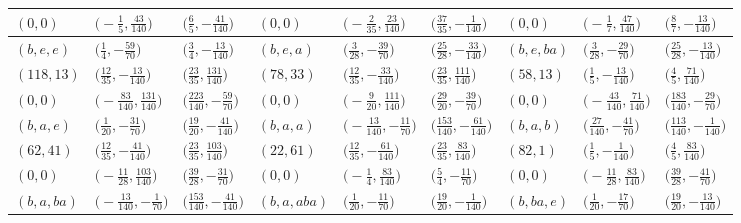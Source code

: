 \documentclass[pdftex]{sigma}
\theoremstyle{definition}
\numberwithin{equation}{section}
\begin{document}
\begin{landscape}
\begin{table}[th]
\begin{tabular}{|lll|lll|lll|}
\\
$(0, 0)$ & $\bigl(-\frac{1}{5}, \frac{43}{140}\bigr)$ & $\bigl(\frac{6}{5}, -\frac{41}{140}\bigr)$ & $(0, 0)$ & $\bigl(-\frac{2}{35}, \frac{23}{140}\bigr)$ & $\bigl(\frac{37}{35}, -\frac{1}{140}\bigr)$ & $(0, 0)$ & $\bigl(-\frac{1}{7}, \frac{47}{140}\bigr)$ & $\bigl(\frac{8}{7}, -\frac{13}{140}\bigr)$
\\\hline
$(b, e, e)$ & $\bigl(\frac{1}{4}, -\frac{59}{70}\bigr)$ & $\bigl(\frac{3}{4}, -\frac{13}{140}\bigr)$ & $(b, e, a)$ & $\bigl(\frac{3}{28}, -\frac{39}{70}\bigr)$ & $\bigl(\frac{25}{28}, -\frac{33}{140}\bigr)$ & $(b, e, ba)$ & $\bigl(\frac{3}{28}, -\frac{29}{70}\bigr)$ & $\bigl(\frac{25}{28}, -\frac{13}{140}\bigr)$
\\
$(118, 13)$ & $\bigl(\frac{12}{35}, -\frac{13}{140}\bigr)$ & $\bigl(\frac{23}{35}, \frac{131}{140}\bigr)$ & $(78, 33)$ & $\bigl(\frac{12}{35}, -\frac{33}{140}\bigr)$ & $\bigl(\frac{23}{35}, \frac{111}{140}\bigr)$ & $(58, 13)$ & $\bigl(\frac{1}{5}, -\frac{13}{140}\bigr)$ & $\bigl(\frac{4}{5}, \frac{71}{140}\bigr)$
\\
$(0, 0)$ & $\bigl(-\frac{83}{140}, \frac{131}{140}\bigr)$ & $\bigl(\frac{223}{140}, -\frac{59}{70}\bigr)$ & $(0, 0)$ & $\bigl(-\frac{9}{20}, \frac{111}{140}\bigr)$ & $\bigl(\frac{29}{20}, -\frac{39}{70}\bigr)$ & $(0, 0)$ & $\bigl(-\frac{43}{140}, \frac{71}{140}\bigr)$ & $\bigl(\frac{183}{140}, -\frac{29}{70}\bigr)$
\\\hline
$(b, a, e)$ & $\bigl(\frac{1}{20}, -\frac{31}{70}\bigr)$ & $\bigl(\frac{19}{20}, -\frac{41}{140}\bigr)$ & $(b, a, a)$ & $\bigl(-\frac{13}{140}, -\frac{11}{70}\bigr)$ & $\bigl(\frac{153}{140}, -\frac{61}{140}\bigr)$ & $(b, a, b)$ & $\bigl(\frac{27}{140}, -\frac{41}{70}\bigr)$ & $\bigl(\frac{113}{140}, -\frac{1}{140}\bigr)$
\\
$(62, 41)$ & $\bigl(\frac{12}{35}, -\frac{41}{140}\bigr)$ & $\bigl(\frac{23}{35}, \frac{103}{140}\bigr)$ & $(22, 61)$ & $\bigl(\frac{12}{35}, -\frac{61}{140}\bigr)$ & $\bigl(\frac{23}{35}, \frac{83}{140}\bigr)$ & $(82, 1)$ & $\bigl(\frac{1}{5}, -\frac{1}{140}\bigr)$ & $\bigl(\frac{4}{5}, \frac{83}{140}\bigr)$
\\
$(0, 0)$ & $\bigl(-\frac{11}{28}, \frac{103}{140}\bigr)$ & $\bigl(\frac{39}{28}, -\frac{31}{70}\bigr)$ & $(0, 0)$ & $\bigl(-\frac{1}{4}, \frac{83}{140}\bigr)$ & $\bigl(\frac{5}{4}, -\frac{11}{70}\bigr)$ & $(0, 0)$ & $\bigl(-\frac{11}{28}, \frac{83}{140}\bigr)$ & $\bigl(\frac{39}{28}, -\frac{41}{70}\bigr)$
\\\hline
$(b, a, ba)$ & $\bigl(-\frac{13}{140}, -\frac{1}{70}\bigr)$ & $\bigl(\frac{153}{140}, -\frac{41}{140}\bigr)$ & $(b, a, aba)$ & $\bigl(\frac{1}{20}, -\frac{11}{70}\bigr)$ & $\bigl(\frac{19}{20}, -\frac{1}{140}\bigr)$ & $(b, ba, e)$ & $\bigl(\frac{1}{20}, -\frac{17}{70}\bigr)$ & $\bigl(\frac{19}{20}, -\frac{13}{140}\bigr)$

\end{tabular}
\end{table}
\end{landscape}
\end{document}
